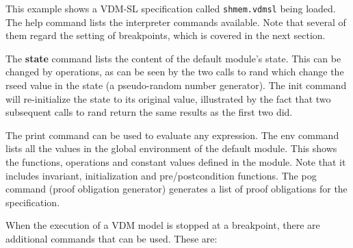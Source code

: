 \documentclass{overturerepchap}
\begin{document}
This example shows a VDM-SL specification called \texttt{shmem.vdmsl} being
loaded. The help command lists the interpreter commands
available. Note that several of them regard the setting of
breakpoints, which is covered in the next section.


The {\textbf{\ttfamily state}} command lists the content of the default module's
state. This can be changed by operations, as can be seen by the two
calls to rand which change the rseed value in the state (a
pseudo-random number generator). The {\textbf\ttfamily init} command will re-initialize
the state to its original value, illustrated by the fact that two
subsequent calls to rand return the same results as the first two did.

The {\textbf\ttfamily print} command can be used to
evaluate any expression.  The {\textbf\ttfamily env} command
lists all the values in the global environment of the default
module. This shows the functions, operations and constant values
defined in the module. Note that it includes invariant, initialization
and pre/postcondition functions.  The {\textbf\ttfamily pog} command (proof obligation
generator) generates a list of proof obligations for the
specification.


When the execution of a VDM model is stopped at a
breakpoint, there are additional commands that can be used. These are:
\end{document}
